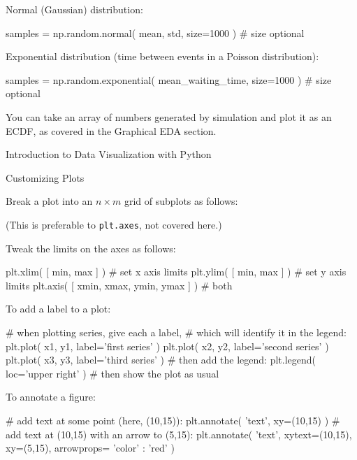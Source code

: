 \documentclass[a4paper,landscape,columns=3]{cheatsheet}
\def\chap#1{\vspace{5mm}\begin{tcolorbox}[colback=red!5!white,colframe=red!75!black,leftrule=3mm]
    \Large #1
\end{tcolorbox}}
\def\sect#1{\begin{tcolorbox}[colback=blue!5!white,colframe=blue!75!black,size=title,leftrule=2mm]
    \large #1
\end{tcolorbox}}
\begin{document}
Normal (Gaussian) distribution:
\begin{python}
samples = np.random.normal(
    mean, std, size=1000 )          # size optional
\end{python}

Exponential distribution (time between events in a Poisson distribution):
\begin{python}
samples = np.random.exponential(
    mean_waiting_time, size=1000 )  # size optional
\end{python}

You can take an array of numbers generated by simulation and plot it as an ECDF, as covered in the Graphical EDA section.

\chap{Introduction to Data Visualization with Python}

\sect{Customizing Plots}

Break a plot into an $n\times m$ grid of subplots as follows:

(This is preferable to \lstinline{plt.axes}, not covered here.)

Tweak the limits on the axes as follows:
\begin{python}
plt.xlim( [ min, max ] )  # set x axis limits
plt.ylim( [ min, max ] )  # set y axis limits
plt.axis( [ xmin, xmax, ymin, ymax ] ) # both
\end{python}

To add a label to a plot:
\begin{python}
# when plotting series, give each a label,
# which will identify it in the legend:
plt.plot( x1, y1, label='first series' )
plt.plot( x2, y2, label='second series' )
plt.plot( x3, y3, label='third series' )
# then add the legend:
plt.legend( loc='upper right' )
# then show the plot as usual
\end{python}

To annotate a figure:
\begin{python}
# add text at some point (here, (10,15)):
plt.annotate( 'text', xy=(10,15) )
# add text at (10,15) with an arrow to (5,15):
plt.annotate( 'text', xytext=(10,15), xy=(5,15),
              arrowprops={ 'color' : 'red' } )
\end{python}
\end{document}
